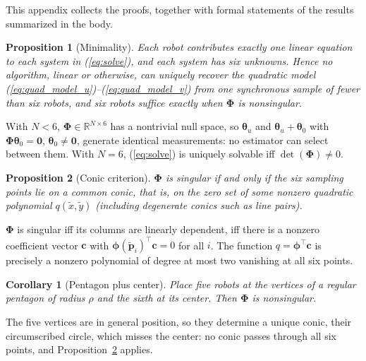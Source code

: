 \documentclass[lettersize,journal]{IEEEtran}
\newtheorem{proposition}{Proposition}
\newtheorem{corollary}{Corollary}
\begin{document}
This appendix collects the proofs, together with formal statements of
the results summarized in the body.

\begin{proposition}[Minimality]
\label{prop:minimality}
Each robot contributes exactly one linear equation to each system in
(\ref{eq:solve}), and each system has six unknowns. Hence no algorithm,
linear or otherwise, can uniquely recover the quadratic model
(\ref{eq:quad_model_u})--(\ref{eq:quad_model_v}) from one synchronous
sample of fewer than six robots, and six robots suffice exactly when
$\boldsymbol{\Phi}$ is nonsingular.
\end{proposition}

\begin{IEEEproof}
With $N < 6$, $\boldsymbol{\Phi} \in \mathbb{R}^{N \times 6}$ has a
nontrivial null space, so $\boldsymbol{\theta}_u$ and
$\boldsymbol{\theta}_u + \boldsymbol{\theta}_0$ with
$\boldsymbol{\Phi}\boldsymbol{\theta}_0 = \mathbf{0}$,
$\boldsymbol{\theta}_0 \neq \mathbf{0}$, generate identical
measurements: no estimator can select between them. With $N = 6$,
(\ref{eq:solve}) is uniquely solvable iff $\det(\boldsymbol{\Phi})
\neq 0$.
\end{IEEEproof}

\begin{proposition}[Conic criterion]
\label{prop:conic}
$\boldsymbol{\Phi}$ is singular if and only if the six sampling points
lie on a common conic, that is, on the zero set of some nonzero quadratic
polynomial $q(\tilde{x}, \tilde{y})$ (including degenerate conics such as
line pairs).
\end{proposition}

\begin{IEEEproof}
$\boldsymbol{\Phi}$ is singular iff its columns are linearly dependent,
iff there is a nonzero coefficient vector $\mathbf{c}$ with
$\boldsymbol{\phi}(\tilde{\mathbf{p}}_i)^\top \mathbf{c} = 0$ for all
$i$. The function $q = \boldsymbol{\phi}^\top \mathbf{c}$ is precisely a
nonzero polynomial of degree at most two vanishing at all six points.
\end{IEEEproof}

\begin{corollary}[Pentagon plus center]
\label{cor:pentagon}
Place five robots at the vertices of a regular pentagon of radius $\rho$
and the sixth at its center. Then $\boldsymbol{\Phi}$ is nonsingular.
\end{corollary}

\begin{IEEEproof}
The five vertices are in general position, so they determine a unique
conic, their circumscribed circle, which misses the center: no conic
passes through all six points, and Proposition~\ref{prop:conic}
applies.
\end{IEEEproof}
\end{document}

